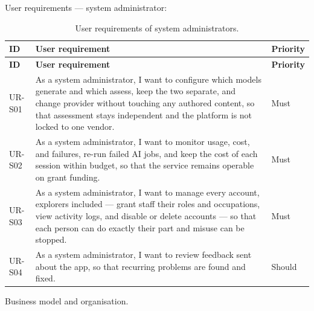User requirements --- system administrator:

{\small
\begin{longtable}{|>{\raggedright\arraybackslash}p{}|>{\raggedright\arraybackslash}p{}|>{\raggedright\arraybackslash}p{}|}
\caption{User requirements of system administrators.} \\
\hline
\textbf{ID} & \textbf{User requirement} & \textbf{Priority} \\ \hline
\endfirsthead
\hline
\textbf{ID} & \textbf{User requirement} & \textbf{Priority} \\ \hline
\endhead
UR-S01 & As a system administrator, I want to configure which models generate and which assess, keep the two separate, and change provider without touching any authored content, so that assessment stays independent and the platform is not locked to one vendor. & Must \\ \hline
UR-S02 & As a system administrator, I want to monitor usage, cost, and failures, re-run failed AI jobs, and keep the cost of each session within budget, so that the service remains operable on grant funding. & Must \\ \hline
UR-S03 & As a system administrator, I want to manage every account, explorers included --- grant staff their roles and occupations, view activity logs, and disable or delete accounts --- so that each person can do exactly their part and misuse can be stopped. & Must \\ \hline
UR-S04 & As a system administrator, I want to review feedback sent about the app, so that recurring problems are found and fixed. & Should \\ \hline
\end{longtable}
}

Business model and organisation.

